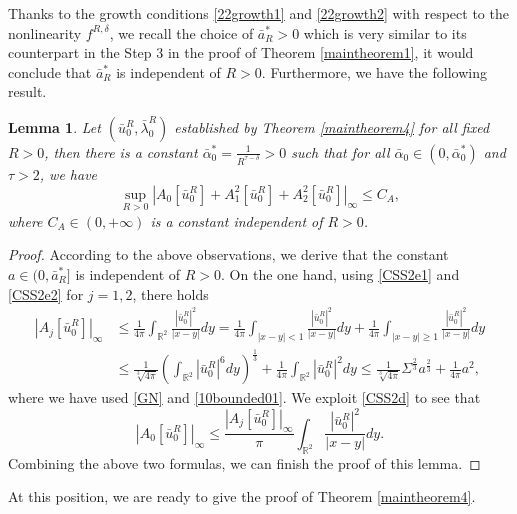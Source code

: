 \documentclass[11pt]{amsart}
\numberwithin{equation}{section}
\newtheorem{lemma}[theorem]{Lemma}
\theoremstyle{definition}
\newcommand{\R}{\mathbb{R}}
\begin{document}
Thanks to the growth conditions \eqref{22growth1} and \eqref{22growth2} with respect to the nonlinearity $f^{R,\delta}$,
we recall the choice of $\bar{a}^*_R>0$ which is very similar to its counterpart in the Step
3 in the proof of Theorem \ref{maintheorem1}, it would conclude that
 $\bar{a}^*_R$ is independent of $R>0$.
 Furthermore, we have the following result.

 \begin{lemma}\label{3A}
 Let $(\bar{u}_0^R,\bar{\lambda}_0^R)$
established by Theorem \ref{maintheorem4} for all fixed $R>0$, then there is a constant
 $\bar{\alpha}_0^*=\frac{1}{R^{\tau-\delta}}>0$ such that for all $\bar{\alpha}_0\in(0,\bar{\alpha}_0^*)$ and $\tau>2$, we have
 \[
 \sup_{R>0}|A_0[\bar{u}_0^R]+A_1^2[\bar{u}_0^R]+A_2^2[\bar{u}_0^R]|_\infty\leq C_A,
 \]
 where $C_A\in(0,+\infty)$ is a constant independent of $R>0$.
 \end{lemma}

 \begin{proof}
 According to the above observations, we derive that the constant $a\in(0,\bar{a}^*_R]$
 is independent of $R>0$. On the one hand, using \eqref{CSS2e1} and \eqref{CSS2e2} for $j=1,2$, there holds
 \begin{align*}
|A_j[\bar{u}_0^R]|_\infty& \leq \frac1{4\pi}\int_{\R^2}\frac{|\bar{u}_0^R|^2}{|x-y|}dy
=\frac1{4\pi}\int_{|x-y|<1}\frac{|\bar{u}_0^R|^2}{|x-y|}dy
+\frac1{4\pi}\int_{|x-y|\geq1}\frac{|\bar{u}_0^R|^2}{|x-y|}dy \\
  &\leq  \frac1{\sqrt[3]{4\pi}}\left(\int_{\R^2} |\bar{u}_0^R|^6dy\right)^{\frac13}
+\frac1{4\pi}\int_{\R^2} |\bar{u}_0^R|^2 dy\leq \frac1{\sqrt[3]{4\pi}}\Sigma^{\frac23}a^{\frac23}+\frac1{4\pi}a^2,
\end{align*}
where we have used \eqref{GN} and \eqref{10bounded01}. We exploit \eqref{CSS2d} to see that
\[
|A_0[\bar{u}_0^R]|_\infty\leq \frac{|A_j[\bar{u}_0^R]|_\infty}\pi\int_{\R^2}\frac{|\bar{u}_0^R|^2}{|x-y|}dy.
\]
Combining the above two formulas, we can finish the proof of this lemma.
 \end{proof}

At this position, we are ready to give the proof of Theorem \ref{maintheorem4}.
\end{document}
